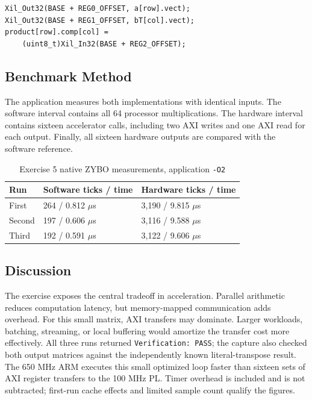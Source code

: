 \documentclass[11pt,a4paper]{article}
\begin{document}
\begin{minipage}{\textwidth}
\begin{lstlisting}[style=cppstyle,caption={Memory-mapped accelerator access}]
Xil_Out32(BASE + REG0_OFFSET, a[row].vect);
Xil_Out32(BASE + REG1_OFFSET, bT[col].vect);
product[row].comp[col] =
    (uint8_t)Xil_In32(BASE + REG2_OFFSET);
\end{lstlisting}
\end{minipage}

\subsection{Benchmark Method}
The application measures both implementations with identical inputs. The
software interval contains all 64 processor multiplications. The hardware
interval contains sixteen accelerator calls, including two AXI writes and one
AXI read for each output. Finally, all sixteen hardware outputs are compared
with the software reference.

\begin{table}[H]
\centering
\caption{Exercise 5 native ZYBO measurements, application \texttt{-O2}}
\begin{tabularx}{\textwidth}{p{3.0cm} X X}
\toprule
\textbf{Run} & \textbf{Software ticks / time} & \textbf{Hardware ticks / time} \\
\midrule
First & 264 / 0.812 $\mu$s & 3,190 / 9.815 $\mu$s \\
Second & 197 / 0.606 $\mu$s & 3,116 / 9.588 $\mu$s \\
Third & 192 / 0.591 $\mu$s & 3,122 / 9.606 $\mu$s \\
\bottomrule
\end{tabularx}
\end{table}

\subsection{Discussion}
The exercise exposes the central tradeoff in acceleration. Parallel arithmetic
reduces computation latency, but memory-mapped communication adds overhead. For
this small matrix, AXI transfers may dominate. Larger workloads, batching,
streaming, or local buffering would amortize the transfer cost more effectively.
All three runs returned \texttt{Verification: PASS}; the capture also checked
both output matrices against the independently known literal-transpose result.
The 650 MHz ARM executes this small optimized loop faster than sixteen sets of
AXI register transfers to the 100 MHz PL. Timer overhead is included and is not
subtracted; first-run cache effects and limited sample count qualify the figures.
\end{document}
